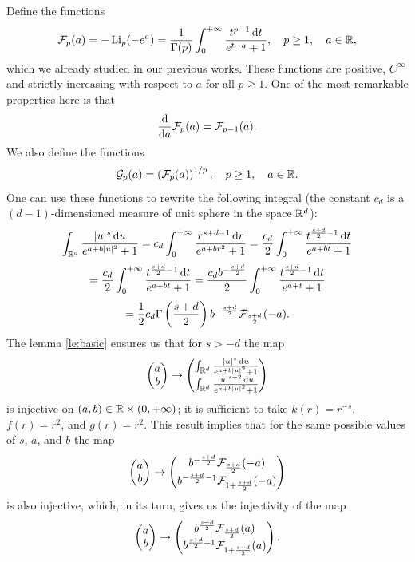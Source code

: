 \documentclass[a4paper]{article}
\begin{document}
Define the functions
\begin{equation}
	\mathcal F_p(a) = -\operatorname{Li}_p(-e^{a}) = \frac{1}{\Gamma(p)}\int_{0}^{+\infty}\frac{t^{p-1}{\,\mathrm dt}}{e^{t-a}+1},\quad p\ge1, \quad a\in{\mathbb R},
	\label{eq:def:F}
\end{equation}
which we already studied in our previous works.
These functions are positive, $C^{\infty}$ and strictly increasing with respect to $a$ for all $p\ge1$.
One of the most remarkable properties here is that
\[
	\frac{\mathrm d}{\mathrm da}\mathcal F_p(a)=\mathcal F_{p-1}(a).
\]
We also define the functions
\begin{equation}
	\G_p(a) = \left( \F_p(a) \right)^{1/p},\quad p\ge1, \quad a\in\mbo.
%
	\label{eq:def:G}
\end{equation}
One can use these functions to rewrite the following integral (the constant $c_d$ is a $(d-1)$-dimensioned measure of unit sphere in the space ${\mathbb R^d}$):
\[
	\int_{{\mathbb R^d}}^{}\frac{|u|^s{\,\mathrm du}}{e^{a+b|u|^2}+1} = c_d\int_{0}^{+\infty}\frac{r^{s+d-1}{\,\mathrm dr}}{e^{a+br^2}+1}=\frac{c_d}{2}\int_{0}^{+\infty}\frac{t^{\frac{s+d}{2}-1}{\,\mathrm dt}}{e^{a+bt}+1}
\]
\[
	=\frac{c_d}{2}\int_{0}^{+\infty}\frac{t^{\frac{s+d}{2}-1}{\,\mathrm dt}}{e^{a+bt}+1}
	=\frac{c_db^{-\frac{s+d}{2}}}{2}\int_{0}^{+\infty}\frac{t^{\frac{s+d}{2}-1}{\,\mathrm dt}}{e^{a+t}+1}
\]
\[
	=\frac{1}{2}c_d\Gamma\left( \frac{s+d}{2} \right)b^{-\frac{s+d}{2}}\mathcal F_{\frac{s+d}{2}}(-a).
\]
The lemma \ref{le:basic} ensures us that for $s>-d$ the map
\[
	\begin{pmatrix}
		a\\b
	\end{pmatrix}
	\to 
	\begin{pmatrix}
		\int_{{\mathbb R^d}}^{}\frac{|u|^s{\,\mathrm du}}{e^{a+b|u|^2}+1}\\
		\int_{{\mathbb R^d}}^{}\frac{|u|^{s+2}{\,\mathrm du}}{e^{a+b|u|^2}+1}
	\end{pmatrix}
\]
is injective on $(a,b)\in{\mathbb R}\times(0,+\infty)$; it is sufficient to take $k(r)=r^{-s}$, $f(r)=r^2$, and $g(r)=r^2$. This result implies that for the same possible values of $s$, $a$, and $b$ the map 
\[
	\begin{pmatrix}
		a\\b
	\end{pmatrix}
	\to 
	\begin{pmatrix}
		b^{-\frac{s+d}{2}}\mathcal F_{\frac{s+d}{2}}(-a)\\
		b^{-\frac{s+d}{2}-1}\mathcal F_{1+\frac{s+d}{2}}(-a)
	\end{pmatrix}
\]
is also injective, which, in its turn, gives us the injectivity of the map
\[
	\begin{pmatrix}
		a\\b
	\end{pmatrix}
	\to 
	\begin{pmatrix}
		b^{\frac{s+d}{2}}\mathcal F_{\frac{s+d}{2}}(a)\\
		b^{\frac{s+d}{2}+1}\mathcal F_{1+\frac{s+d}{2}}(a)
	\end{pmatrix}.
\]
\end{document}
